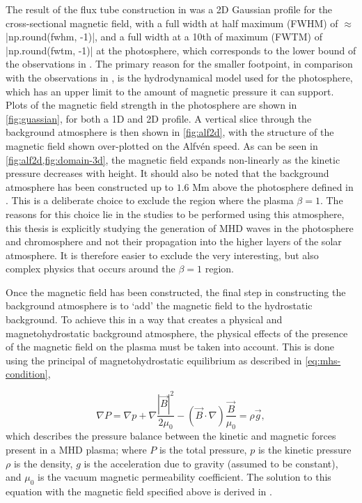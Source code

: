 The result of the flux tube construction in \cite{gent2013, gent2014} was a 2D Gaussian profile for the cross-sectional magnetic field, with a full width at half maximum (FWHM) of $\approx$ \py[chapter3]|np.round(fwhm, -1)|, and a full width at a 10th of maximum (FWTM) of \py[chapter3]|np.round(fwtm, -1)| at the photosphere, which corresponds to the lower bound of the observations in \cite{utz2013}.
The primary reason for the smaller footpoint, in comparison with the observations in \cite{utz2013}, is the hydrodynamical model used for the photosphere, which has an upper limit to the amount of magnetic pressure it can support.
Plots of the magnetic field strength in the photosphere are shown in \cref{fig:guassian}, for both a 1D and 2D profile.
A vertical slice through the background atmosphere is then shown in \cref{fig:alf2d}, with the structure of the magnetic field shown over-plotted on the Alfv\'en speed.
As can be seen in \cref{fig:alf2d,fig:domain-3d}, the magnetic field expands non-linearly as the kinetic pressure decreases with height.
It should also be noted that the background atmosphere has been constructed up to $1.6$ Mm above the photosphere defined in \cite{vernazza1981}.
This is a deliberate choice to exclude the region where the plasma $\beta = 1$.
The reasons for this choice lie in the studies to be performed using this atmosphere, this thesis is explicitly studying the generation of MHD waves in the photosphere and chromosphere and not their propagation into the higher layers of the solar atmosphere.
It is therefore easier to exclude the very interesting, but also complex physics that occurs around the $\beta = 1$ region.

Once the magnetic field has been constructed, the final step in constructing the background atmosphere is to `add' the magnetic field to the hydrostatic background.
To achieve this in a way that creates a physical and magnetohydrostatic background atmosphere, the physical effects of the presence of the magnetic field on the plasma must be taken into account.
This is done using the principal of magnetohydrostatic equilibrium as described in \cref{eq:mhs-condition},

\begin{equation}
\nabla P = 
\nabla p + \nabla \frac{|\vec{B}|^2}{2\mu_0} - (\vec{B}\cdot\nabla)
{\frac{\vec{B}}{\mu_0} }
= \rho \vec{g}, 
\label{eq:mhs-condition}
\end{equation}
which describes the pressure balance between the kinetic and magnetic forces present in a MHD plasma;
where $P$ is the total pressure, $p$ is the kinetic pressure $\rho$ is the density, $g$ is the acceleration due to gravity (assumed to be constant), and $\mu_0$ is the vacuum magnetic permeability coefficient.
The solution to this equation with the magnetic field specified above is derived in \cite{gent2013,gent2014}.


